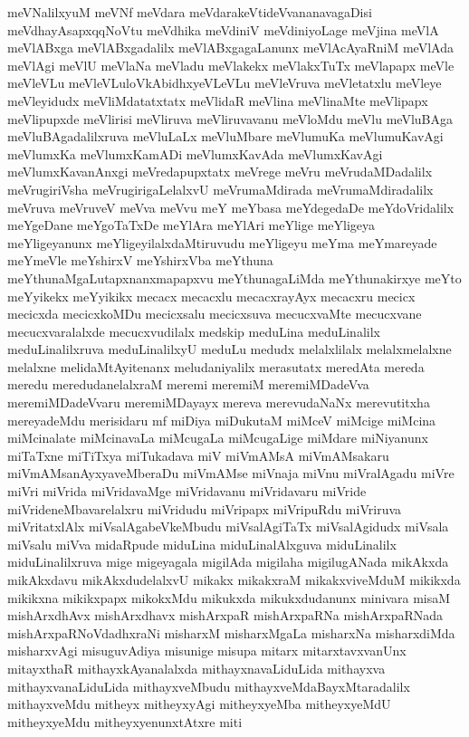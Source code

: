 {meVNalilxyuM
meVNf
meVdara
meVdarakeVtideVvananavagaDisi
meVdhayAsapxqqNoVtu
meVdhika
meVdiniV
meVdiniyoLage
meVjina
meVlA
meVlABxga
meVlABxgadalilx
meVlABxgagaLanunx
meVlAcAyaRniM
meVlAda
meVlAgi
meVlU
meVlaNa
meVladu
meVlakekx
meVlakxTuTx
meVlapapx
meVle
meVleVLu
meVleVLuloVkAbidhxyeVLeVLu
meVleVruva
meVletatxlu
meVleye
meVleyidudx
meVliMdatatxtatx
meVlidaR
meVlina
meVlinaMte
meVlipapx
meVlipupxde
meVlirisi
meVliruva
meVliruvavanu
meVloMdu
meVlu
meVluBAga
meVluBAgadalilxruva
meVluLaLx
meVluMbare
meVlumuKa
meVlumuKavAgi
meVlumxKa
meVlumxKamADi
meVlumxKavAda
meVlumxKavAgi
meVlumxKavanAnxgi
meVredapupxtatx
meVrege
meVru
meVrudaMDadalilx
meVrugiriVsha
meVrugirigaLelalxvU
meVrumaMdirada
meVrumaMdiradalilx
meVruva
meVruveV
meVva
meVvu
meY
meYbasa
meYdegedaDe
meYdoVridalilx
meYgeDane
meYgoTaTxDe
meYlAra
meYlAri
meYlige
meYligeya
meYligeyanunx
meYligeyilalxdaMtiruvudu
meYligeyu
meYma
meYmareyade
meYmeVle
meYshirxV
meYshirxVba
meYthuna
meYthunaMgaLutapxnanxmapapxvu
meYthunagaLiMda
meYthunakirxye
meYto
meYyikekx
meYyikikx
mecacx
mecacxlu
mecacxrayAyx
mecacxru
mecicx
mecicxda
mecicxkoMDu
mecicxsalu
mecicxsuva
mecucxvaMte
mecucxvane
mecucxvaralalxde
mecucxvudilalx
medskip
meduLina
meduLinalilx
meduLinalilxruva
meduLinalilxyU
meduLu
medudx
melalxlilalx
melalxmelalxne
melalxne
melidaMtAyitenanx
meludaniyalilx
merasutatx
meredAta
mereda
meredu
meredudanelalxraM
meremi
meremiM
meremiMDadeVva
meremiMDadeVvaru
meremiMDayayx
mereva
merevudaNaNx
merevutitxha
mereyadeMdu
merisidaru
mf
miDiya
miDukutaM
miMceV
miMcige
miMcina
miMcinalate
miMcinavaLa
miMcugaLa
miMcugaLige
miMdare
miNiyanunx
miTaTxne
miTiTxya
miTukadava
miV
miVmAMsA
miVmAMsakaru
miVmAMsanAyxyaveMberaDu
miVmAMse
miVnaja
miVnu
miVralAgadu
miVre
miVri
miVrida
miVridavaMge
miVridavanu
miVridavaru
miVride
miVrideneMbavarelalxru
miVridudu
miVripapx
miVripuRdu
miVriruva
miVritatxlAlx
miVsalAgabeVkeMbudu
miVsalAgiTaTx
miVsalAgidudx
miVsala
miVsalu
miVva
midaRpude
miduLina
miduLinalAlxguva
miduLinalilx
miduLinalilxruva
mige
migeyagala
migilAda
migilaha
migilugANada
mikAkxda
mikAkxdavu
mikAkxdudelalxvU
mikakx
mikakxraM
mikakxviveMduM
mikikxda
mikikxna
mikikxpapx
mikokxMdu
mikukxda
mikukxdudanunx
minivara
misaM
mishArxdhAvx
mishArxdhavx
mishArxpaR
mishArxpaRNa
mishArxpaRNada
mishArxpaRNoVdadhxraNi
misharxM
misharxMgaLa
misharxNa
misharxdiMda
misharxvAgi
misuguvAdiya
misunige
misupa
mitarx
mitarxtavxvanUnx
mitayxthaR
mithayxkAyanalalxda
mithayxnavaLiduLida
mithayxva
mithayxvanaLiduLida
mithayxveMbudu
mithayxveMdaBayxMtaradalilx
mithayxveMdu
mitheyx
mitheyxyAgi
mitheyxyeMba
mitheyxyeMdU
mitheyxyeMdu
mitheyxyenunxtAtxre
miti
}
